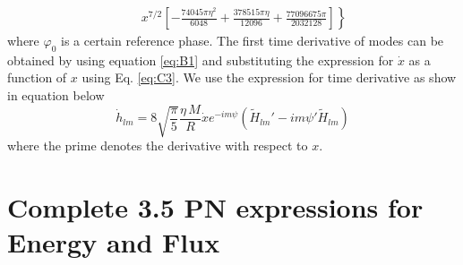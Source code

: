 \documentclass[twocolumn,showpacs,aps,prd,nobibnotes,floatfix]{revtex4-1}
\begin{document}
\begin{widetext}
\begin{align}
&\quad \left.x^{7/2}\left[-\frac{74045\pi\eta^2}{6048} + \frac{378515\pi\eta}{12096} + \frac{77096675\pi}{2032128}\right]\right\}
\end{align} 
where $\varphi_0$ is a certain reference phase. The first time derivative of modes can be obtained by using equation \ref{eq:B1} and substituting the expression for $\dot{x}$ as a function of $x$ using Eq. \ref{eq:C3}. We use the expression for time derivative as show in equation below
\begin{equation}
	\dot{h}_{lm} = 8\sqrt{\frac{\pi}{5}}\frac{\eta\,M}{R}\dot{x}e^{-\mathit{i}m\psi}\left(\tilde{H}_{lm}' - \mathit{i}m\psi'\tilde{H}_{lm} \right)
\end{equation}
where the prime denotes the derivative with respect to $x$.

\section{Complete 3.5 PN expressions for Energy and Flux}\label{Appendix:C}


\end{widetext}
\end{document}

